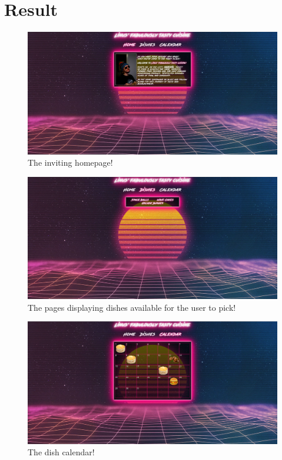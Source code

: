 \documentclass[a4paper]{scrartcl}
\begin{document}
\section{Result}
\begin{figure}[H]
  \begin{center}
    \includegraphics[scale=0.3]{images/Scr2.jpg}
    \caption{The inviting homepage!}
    \label{fig:homepage}
  \end{center}
\end{figure}

\begin{figure}[H]
  \begin{center}
    \includegraphics[scale=0.3]{images/Scr3.jpg}
    \caption{The pages displaying dishes available for the user to pick!}
    \label{fig:dishes}
  \end{center}
\end{figure}

\begin{figure}[H]
  \begin{center}
    \includegraphics[scale=0.3]{images/Scr6.jpg}
    \caption{The dish calendar!}
    \label{fig:calendar}
  \end{center}
\end{figure}
\end{document}
